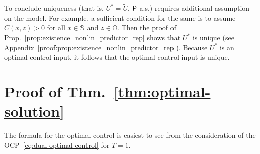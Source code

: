 \documentclass[twoside,11pt]{article}
\def\bS{\begin{slide}}
\def\Thm#1{Thm.~\ref{#1}}
\def\Prop#1{Prop.~\ref{#1}}
\def\bS{\mathbb{S}}
\def\bO{\mathbb{O}}
\def\sP{{\sf P}}
\begin{document}
\begin{remark}\label{rem:uniqueness_of_U}
To conclude uniqueness (that is, $U^*=\tilde{U}$, $\sP$-a.s.) requires
additional assumption on the model.  For example, a sufficient
condition for the same is to assume $C(x,z)>0$ for all $x\in\bS$ and $z\in\bO$.
Then the proof of \Prop{prop:existence_nonlin_predictor_rep} shows
that $U^*$ is unique (see
Appendix~\ref{proof:prop:existence_nonlin_predictor_rep}).  Because
$U^*$ is an optimal control input, it follows that the optimal
control input is unique. 
\end{remark}




\section{Proof of  \Thm{thm:optimal-solution}}
\label{appdx:proof_of_optimal-solution}

The formula for the optimal control is easiest to see from the consideration of the OCP~\eqref{eq:dual-optimal-control} for $T=1$. 
\end{document}
